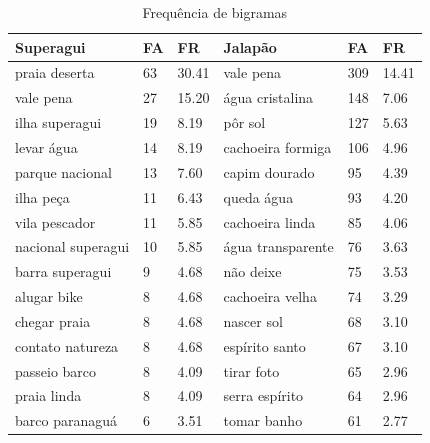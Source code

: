 \documentclass[preprint, 3p,
authoryear]{elsarticle} %
\begin{document}
\begin{table}[!h]

\caption{\label{tab:tab2}\label{tab2}Frequência de bigramas}
\centering
\begin{tabular}[t]{llllll}
\toprule
\textbf{Superagui} & \textbf{FA} & \textbf{FR} & \textbf{Jalapão} & \textbf{FA} & \textbf{FR}\\
\midrule
praia deserta & 63 & 30.41 & vale pena & 309 & 14.41\\
vale pena & 27 & 15.20 & água cristalina & 148 & 7.06\\
ilha superagui & 19 & 8.19 & pôr sol & 127 & 5.63\\
levar água & 14 & 8.19 & cachoeira formiga & 106 & 4.96\\
parque nacional & 13 & 7.60 & capim dourado & 95 & 4.39\\
\addlinespace
ilha peça & 11 & 6.43 & queda água & 93 & 4.20\\
vila pescador & 11 & 5.85 & cachoeira linda & 85 & 4.06\\
nacional superagui & 10 & 5.85 & água transparente & 76 & 3.63\\
barra superagui & 9 & 4.68 & não deixe & 75 & 3.53\\
alugar bike & 8 & 4.68 & cachoeira velha & 74 & 3.29\\
\addlinespace
chegar praia & 8 & 4.68 & nascer sol & 68 & 3.10\\
contato natureza & 8 & 4.68 & espírito santo & 67 & 3.10\\
passeio barco & 8 & 4.09 & tirar foto & 65 & 2.96\\
praia linda & 8 & 4.09 & serra espírito & 64 & 2.96\\
barco paranaguá & 6 & 3.51 & tomar banho & 61 & 2.77\\
\bottomrule
\end{tabular}
\end{table}
\end{document}
